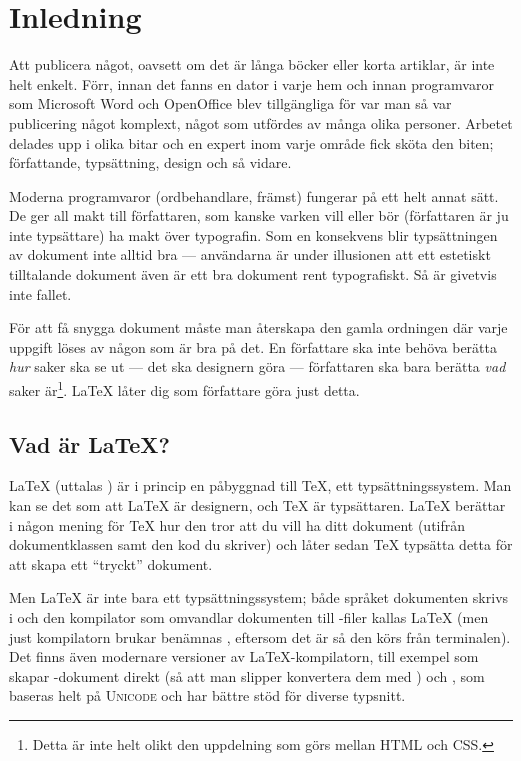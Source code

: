 \documentclass[10pt,../../a4.tex]{subfiles}
\begin{document}
\nopagebreak
{}\nopagebreak
{}\nopagebreak
\chapter*{Inledning}
Att publicera något, oavsett om det är långa böcker eller korta artiklar,
är inte helt enkelt. Förr, innan det fanns en dator i varje hem och innan
programvaror som Microsoft Word och Open\-Office blev tillgängliga för var
man så var publicering något komplext, något som utfördes av många olika
personer. Arbetet delades upp i olika bitar och en expert inom varje
område fick sköta den biten; författande, typsättning, design och så
vidare.

Moderna programvaror (ordbehandlare, främst) fungerar på ett helt annat
sätt. De ger all makt till författaren, som kanske varken vill eller bör
(författaren är ju inte typsättare) ha makt över typografin. Som en konsekvens
blir typsättningen av dokument inte alltid bra — användarna är under
illusionen att ett estetiskt tilltalande dokument även är ett bra dokument
rent typografiskt. Så är givetvis inte fallet.

För att få snygga dokument måste man återskapa den gamla ordningen där
varje uppgift löses av någon som är bra på det. En författare ska inte
behöva berätta \emph{hur} saker ska se ut — det ska designern göra —
författaren ska bara berätta \emph{vad} saker är\footnote{Detta är inte
helt olikt den uppdelning som görs mellan HTML och CSS.}. \LaTeX{} låter
dig som författare göra just detta.

\nopagebreak
{}\nopagebreak
{}\nopagebreak
\section*{Vad är \LaTeX{}?}
\LaTeX{} (uttalas ) är i princip en
påbyggnad till \TeX{}, ett typsättningssystem. Man kan se det som att
\LaTeX{} är designern, och \TeX{} är typsättaren. \LaTeX{} berättar i
någon mening för \TeX{} hur den tror att du vill ha ditt dokument (utifrån
dokumentklassen samt den kod du skriver) och låter sedan \TeX{} typsätta
detta för att skapa ett \enquote{tryckt} dokument.

Men \LaTeX{} är inte bara ett typsättningssystem; både språket dokumenten
skrivs i och den kompilator som omvandlar dokumenten till \DVI-filer
kallas \LaTeX{} (men just kompilatorn brukar benämnas ,
eftersom det är så den körs från terminalen). Det finns även modernare
versioner av \LaTeX{}-kompilatorn, till exempel \pdfLaTeX{} som skapar
\PDF-dokument
 direkt (så att man slipper konvertera dem med ) och
\XeTeX{}, som baseras helt på \textsc{Unicode} och har bättre stöd för
diverse typsnitt.
\end{document}
